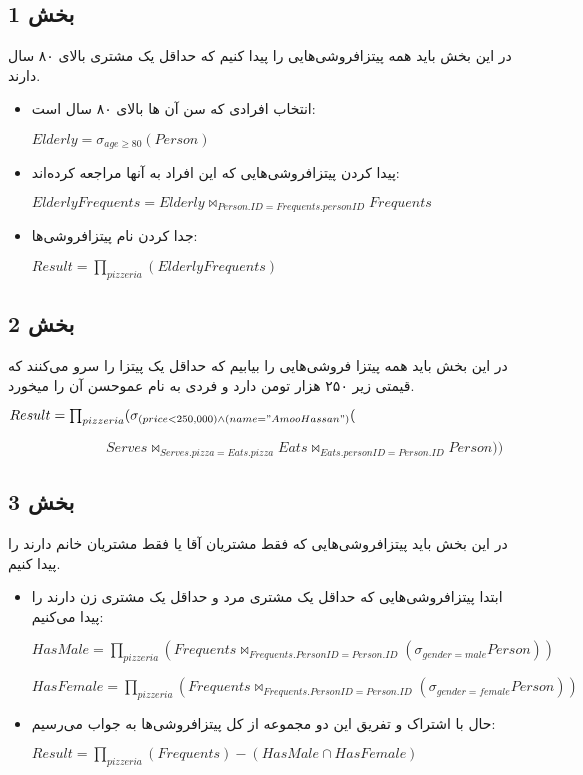 \subsection*{بخش 1}
در این بخش باید همه پیتزافروشی‌هایی را پیدا کنیم که حداقل یک مشتری بالای ۸۰ سال دارند.
\begin{itemize}	
	\item انتخاب افرادی که سن آن ها بالای ۸۰ سال است:
	
	\setLTR
	$Elderly = \sigma_{age \geq 80} (Person)$
	\setRTL
	\item پیدا کردن پیتزافروشی‌هایی که این افراد به آنها مراجعه کرده‌اند:
	
	\setLTR
	$ElderlyFrequents = Elderly \bowtie_{Person.ID=Frequents.personID} Frequents$
	\setRTL
	
	\item جدا کردن نام پیتزافروشی‌ها:
	
	\setLTR
	$Result = \prod_{pizzeria} (ElderlyFrequents)$
	\setRTL
\end{itemize}




\subsection*{بخش 2}
در این بخش باید همه پیتزا فروشی‌هایی را بیابیم که حداقل یک پیتزا را سرو می‌کنند که قیمتی زیر ۲۵۰ هزار
تومن دارد و فردی به نام عموحسن آن را میخورد.

	\setLTR
	$Result = \prod_{pizzeria}(\sigma_{(price<250,000)\land(name="Amoo Hassan")}($
	
	$\qquad \qquad \qquad \quad  Serves\bowtie_{Serves.pizza=Eats.pizza}Eats \bowtie_{Eats.personID=Person.ID}Person))$

	\setRTL


\subsection*{بخش 3}
در این بخش باید پیتزافروشی‌هایی که فقط مشتریان آقا یا فقط مشتریان خانم دارند را پیدا کنیم.
\begin{itemize}	
	\item 
	ابتدا پیتزافروشی‌هایی که حداقل یک مشتری مرد و حداقل یک مشتری زن دارند را پیدا می‌کنیم:
	
	\setLTR
	$HasMale = \prod_{pizzeria}(Frequents \bowtie_{Frequents.PersonID=Person.ID}(\sigma_{gender=male}Person))$
	
	$HasFemale = \prod_{pizzeria}(Frequents \bowtie_{Frequents.PersonID=Person.ID}(\sigma_{gender=female}Person))$
	\setRTL
	
	\item 
	حال با اشتراک و تفریق این دو مجموعه از کل پیتزافروشی‌ها به جواب می‌رسیم:
	\setLTR
	
	$Result = \prod_{pizzeria}(Frequents) - (HasMale \cap HasFemale)$
	\setRTL
	
	\pagebreak
	
\end{itemize}


